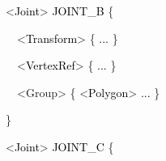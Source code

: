 \documentclass[a4paper]{article}
\newcommand\textstyleOOoComputerKeyWord[1]{\textrm{\textcolor[rgb]{0.0,0.0,0.5019608}{#1}}}
\newcommand\textstyleOOoAssemblerSpecialChar[1]{\textrm{\textcolor[rgb]{0.0,0.5019608,0.0}{#1}}}
\newcommand\textstyleOOoAssemblerIdent[1]{\textrm{\textcolor{black}{#1}}}
\newcommand\textstyleOOoAssemblerDirective[1]{\textrm{\textcolor[rgb]{0.0,0.5019608,1.0}{#1}}}
\begin{document}
{\color{black}
\textstyleOOoComputerKeyWord{\textcolor{black}{\ \ \ \ }}\textstyleOOoAssemblerSpecialChar{{\textless}}\textstyleOOoAssemblerIdent{Joint}\textstyleOOoAssemblerSpecialChar{{\textgreater}}\textstyleOOoComputerKeyWord{\textcolor{black}{
}}\textstyleOOoAssemblerIdent{JOINT\_B}\textstyleOOoComputerKeyWord{\textcolor{black}{
}}\textstyleOOoAssemblerSpecialChar{\{}}

{\color{black}
\textstyleOOoComputerKeyWord{\textcolor{black}{\ \ \ \ \ \ }}\textstyleOOoAssemblerSpecialChar{{\textless}}\textstyleOOoAssemblerIdent{Transform}\textstyleOOoAssemblerSpecialChar{{\textgreater}}\textstyleOOoComputerKeyWord{\textcolor{black}{
}}\textstyleOOoAssemblerSpecialChar{\{}\textstyleOOoComputerKeyWord{\textcolor{black}{
}}\textstyleOOoAssemblerIdent{...}\textstyleOOoComputerKeyWord{\textcolor{black}{
}}\textstyleOOoAssemblerSpecialChar{\}}}

{\color{black}
\textstyleOOoComputerKeyWord{\textcolor{black}{\ \ \ \ \ \ }}\textstyleOOoAssemblerSpecialChar{{\textless}}\textstyleOOoAssemblerIdent{VertexRef}\textstyleOOoAssemblerSpecialChar{{\textgreater}}\textstyleOOoComputerKeyWord{\textcolor{black}{
}}\textstyleOOoAssemblerSpecialChar{\{}\textstyleOOoComputerKeyWord{\textcolor{black}{
}}\textstyleOOoAssemblerIdent{...}\textstyleOOoComputerKeyWord{\textcolor{black}{
}}\textstyleOOoAssemblerSpecialChar{\}}}

{\color{black}
\textstyleOOoComputerKeyWord{\textcolor{black}{\ \ \ \ \ \ }}\textstyleOOoAssemblerSpecialChar{{\textless}}\textstyleOOoAssemblerDirective{Group}\textstyleOOoAssemblerSpecialChar{{\textgreater}}\textstyleOOoComputerKeyWord{\textcolor{black}{
}}\textstyleOOoAssemblerSpecialChar{\{}\textstyleOOoComputerKeyWord{\textcolor{black}{
}}\textstyleOOoAssemblerSpecialChar{{\textless}}\textstyleOOoAssemblerIdent{Polygon}\textstyleOOoAssemblerSpecialChar{{\textgreater}}\textstyleOOoComputerKeyWord{\textcolor{black}{
}}\textstyleOOoAssemblerIdent{...}\textstyleOOoComputerKeyWord{\textcolor{black}{
}}\textstyleOOoAssemblerSpecialChar{\}}}

{\color{black}
\textstyleOOoComputerKeyWord{\textcolor{black}{\ \ \ \ }}\textstyleOOoAssemblerSpecialChar{\}}}

{\color{black}
\textstyleOOoComputerKeyWord{\textcolor{black}{\ \ \ \ }}\textstyleOOoAssemblerSpecialChar{{\textless}}\textstyleOOoAssemblerIdent{Joint}\textstyleOOoAssemblerSpecialChar{{\textgreater}}\textstyleOOoComputerKeyWord{\textcolor{black}{
}}\textstyleOOoAssemblerIdent{JOINT\_C}\textstyleOOoComputerKeyWord{\textcolor{black}{
}}\textstyleOOoAssemblerSpecialChar{\{}}
\end{document}
